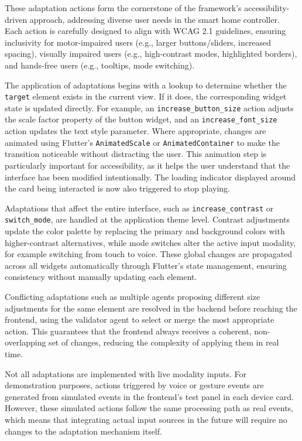 \documentclass[openany]{book}
\begin{document}
These adaptation actions form the cornerstone of the framework’s accessibility-driven approach, addressing diverse user needs in the smart home controller. Each action is carefully designed to align with WCAG 2.1 guidelines, ensuring inclusivity for motor-impaired users (e.g., larger buttons/sliders, increased spacing), visually impaired users (e.g., high-contrast modes, highlighted borders), and hands-free users (e.g., tooltips, mode switching).

The application of adaptations begins with a lookup to determine whether the \texttt{target} element exists in the current view. If it does, the corresponding widget state is updated directly. For example, an \texttt{increase\_button\_size} action adjusts the scale factor property of the button widget, and an \texttt{increase\_font\_size} action updates the text style parameter. Where appropriate, changes are animated using Flutter’s \texttt{AnimatedScale} or \texttt{AnimatedContainer} to make the transition noticeable without distracting the user. This animation step is particularly important for accessibility, as it helps the user understand that the interface has been modified intentionally. The loading indicator displayed around the card being interacted is now also triggered to stop playing.

Adaptations that affect the entire interface, such as \texttt{increase\_contrast} or \texttt{switch\_mode}, are handled at the application theme level. Contrast adjustments update the color palette by replacing the primary and background colors with higher-contrast alternatives, while mode switches alter the active input modality, for example switching from touch to voice. These global changes are propagated across all widgets automatically through Flutter’s state management, ensuring consistency without manually updating each element.

Conflicting adaptations such as multiple agents proposing different size adjustments for the same element are resolved in the backend before reaching the frontend, using the validator agent to select or merge the most appropriate action. This guarantees that the frontend always receives a coherent, non-overlapping set of changes, reducing the complexity of applying them in real time.

Not all adaptations are implemented with live modality inputs. For demonstration purposes, actions triggered by voice or gesture events are generated from simulated events in the frontend’s test panel in each device card. However, these simulated actions follow the same processing path as real events, which means that integrating actual input sources in the future will require no changes to the adaptation mechanism itself.
\end{document}
